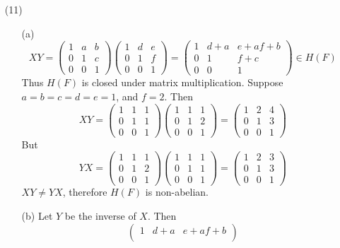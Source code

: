 \documentclass[12pt]{article}
\begin{document}
\begin{itemize}
\item[(11)]
\begin{itemize}
\item[(a)]
$$XY = \begin{pmatrix}
1 & a & b \\
0 & 1 & c \\
0 & 0 & 1
\end{pmatrix}\begin{pmatrix}
1 & d & e \\
0 & 1 & f \\
0 & 0 & 1
\end{pmatrix} = \begin{pmatrix}
1 & d + a & e + af + b \\
0 & 1 & f + c \\
0 & 0 & 1
\end{pmatrix} \in H(F)$$
Thus $H(F)$ is closed under matrix multiplication. Suppose $a = b = c = d = e = 1$, and $f = 2$. Then
$$XY = \begin{pmatrix}
1 & 1 & 1 \\
0 & 1 & 1 \\
0 & 0 & 1
\end{pmatrix}\begin{pmatrix}
1 & 1 & 1 \\
0 & 1 & 2 \\
0 & 0 & 1
\end{pmatrix} = \begin{pmatrix}
1 & 2 & 4 \\
0 & 1 & 3 \\
0 & 0 & 1
\end{pmatrix}$$
But
$$YX = \begin{pmatrix}
1 & 1 & 1 \\
0 & 1 & 2 \\
0 & 0 & 1
\end{pmatrix}\begin{pmatrix}
1 & 1 & 1 \\
0 & 1 & 1 \\
0 & 0 & 1
\end{pmatrix} = \begin{pmatrix}
1 & 2 & 3 \\
0 & 1 & 3 \\
0 & 0 & 1
\end{pmatrix}$$
$XY \neq YX$, therefore $H(F)$ is non-abelian.
\item[(b)]
Let $Y$ be the inverse of $X$. Then
$$\begin{pmatrix}
1 & d + a & e + af + b \\

\end{pmatrix}$$
\end{itemize}
\end{itemize}
\end{document}
